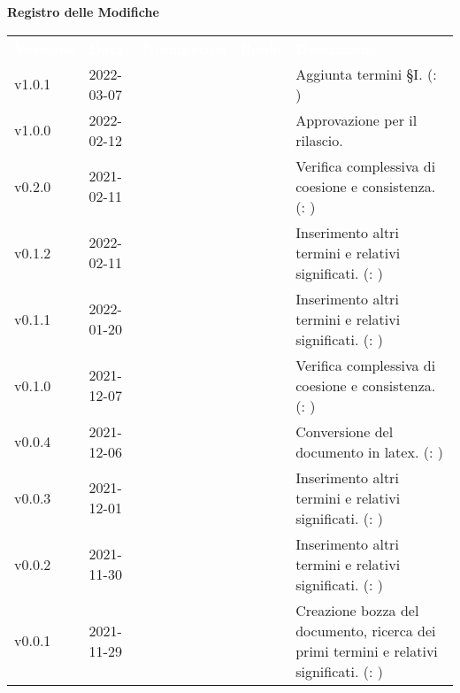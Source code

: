 

{\LARGE{\textbf{Registro delle Modifiche}}} \\


\renewcommand{\arraystretch}{1.5}
\begin{longtable}{ m{}<{\centering}  m{}<{\centering}  m{}<{\centering}  m{}<{\centering}  m{}<{\centering} }
	\rowcolor{darkblue}
	\textcolor{white}{\textbf{Versione}} &\textcolor{white}{\textbf{Data}}& \textcolor{white}{\textbf{Nominativo}} & \textcolor{white}{\textbf{Ruolo}}&\textcolor{white}{\textbf{Descrizione}}\\ 

	v1.0.1 & 2022-03-07 & \GC & \AN & Aggiunta termini \S{}I. (\VE: \textit{}) \\

	v1.0.0 & 2022-02-12 & \FP{} & \RE{} & Approvazione per il rilascio.\\

	v0.2.0& 2021-02-11 & \MG{} & \AM{} & Verifica complessiva di coesione e consistenza. (\VE: \textit{\PV{}})\\

	v0.1.2& 2022-02-11 & \GC{} & \AN{} & Inserimento altri termini e relativi significati. (\VE: \textit{\PV{}})\\
	
	v0.1.1& 2022-01-20 & \MG{} & \AM{} & Inserimento altri termini e relativi significati. (\VE: \textit{\PV{}})\\
	
	v0.1.0& 2021-12-07 & \GC{} & \AN{} & Verifica complessiva di coesione e consistenza. (\VE: \textit{\PV{}})\\
	
	v0.0.4& 2021-12-06& \GC{} & \AN{} & Conversione del documento in latex. (\VE: \textit{\PV{}})\\

	v0.0.3& 2021-12-01& \LW{} & \AN{} & Inserimento altri termini e relativi significati. (\VE: \textit{\PV{}})\\

	v0.0.2& 2021-11-30& \MG{} & \AM{} & Inserimento altri termini e relativi significati. (\VE: \textit{\PV{}})\\

	v0.0.1& 2021-11-29& \GC{} & \AN{} & Creazione bozza del documento, ricerca dei primi termini e relativi significati. (\VE: \textit{\PV{}})\\

\end{longtable}

\pagebreak